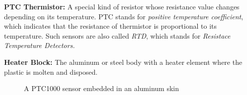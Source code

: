 \textbf{PTC Thermistor:} A special kind of resistor whose resistance value changes depending on its temperature. PTC stands for \textit{positive
temperature coefficient}, which indicates that the resistance of thermistor is proportional to its temperature. Such sensors are also called \textit{RTD}, which stands for \textit{Resistace Temperature Detectors.}

\textbf{Heater Block:} The aluminum or steel body with a heater element where the plastic is molten and disposed.

\begin{figure}[H]
    \centering
    \begin{minipage}{0.4\textwidth}
        \centering
        \caption{\small A PTC1000 sensor embedded in an aluminum skin \cite{pt100}}
    \end{minipage}
    \begin{minipage}{0.4\textwidth}
        \centering

\end{minipage}
\end{figure}
